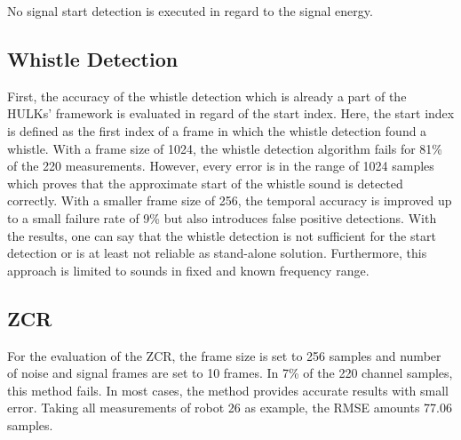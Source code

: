No signal start detection is executed in regard to the signal energy.

\subsection{Whistle Detection}
\label{subsec:04_whistleDetection}

First, the accuracy of the whistle detection which is already a part of the HULKs' framework
is evaluated in regard of the start index.
Here, the start index is defined as the first index of a frame in which the whistle detection
found a whistle.
With a frame size of 1024, the whistle detection algorithm fails for 81\si{\percent}
of the 220 measurements.
However, every error is in the range of 1024 samples which proves that the
approximate start of the whistle sound is detected correctly.
With a smaller frame size of 256, the temporal accuracy is improved up to a small
failure rate of 9\si{\percent} but also introduces false positive detections.
With the results, one can say that the whistle detection is not sufficient
for the start detection or is at least not reliable as stand-alone solution.
Furthermore, this approach is limited to sounds in fixed and known frequency range.


\subsection{ZCR}
\label{subsec:04_zcr}

For the evaluation of the \ac{ZCR},
the frame size is set to 256 samples and number of noise and signal frames
are set to 10 frames.
In 7\si{\percent} of the 220 channel samples, this method fails.
In most cases, the method provides accurate results with
small error. Taking all measurements of robot 26 as example, the \ac{RMSE}
amounts 77.06 samples.

